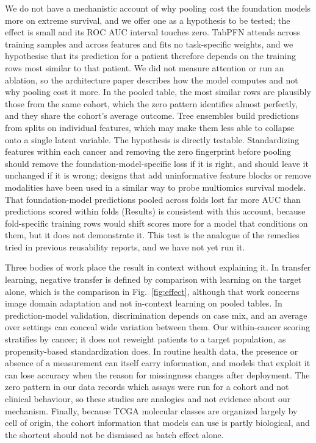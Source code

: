 \documentclass[pdflatex,sn-nature]{sn-jnl}
\begin{document}
We do not have a mechanistic account of why pooling cost the foundation models more on extreme survival, and we offer one as a hypothesis to be tested; the effect is small and its ROC AUC interval touches zero. TabPFN attends across training samples and across features and fits no task-specific weights,\citep{hollmann2025accurate} and we hypothesise that its prediction for a patient therefore depends on the training rows most similar to that patient. We did not measure attention or run an ablation, so the architecture paper describes how the model computes and not why pooling cost it more. In the pooled table, the most similar rows are plausibly those from the same cohort, which the zero pattern identifies almost perfectly, and they share the cohort's average outcome. Tree ensembles build predictions from splits on individual features,\citep{breiman2001random,chen2016xgboost} which may make them less able to collapse onto a single latent variable. The hypothesis is directly testable. Standardizing features within each cancer and removing the zero fingerprint before pooling should remove the foundation-model-specific loss if it is right, and should leave it unchanged if it is wrong; designs that add uninformative feature blocks or remove modalities have been used in a similar way to probe multiomics survival models.\citep{wissel2023systematic} That foundation-model predictions pooled across folds lost far more AUC than predictions scored within folds (Results) is consistent with this account, because fold-specific training rows would shift scores more for a model that conditions on them, but it does not demonstrate it. This test is the analogue of the remedies tried in previous reusability reports, and we have not yet run it.

Three bodies of work place the result in context without explaining it. In transfer learning, negative transfer is defined by comparison with learning on the target alone, which is the comparison in Fig.~\ref{fig:effect}, although that work concerns image domain adaptation and not in-context learning on pooled tables.\citep{wang2019characterizing} In prediction-model validation, discrimination depends on case mix, and an average over settings can conceal wide variation between them.\citep{dejong2023propensity,riley2016external} Our within-cancer scoring stratifies by cancer; it does not reweight patients to a target population, as propensity-based standardization does.\citep{dejong2023propensity} In routine health data, the presence or absence of a measurement can itself carry information, and models that exploit it can lose accuracy when the reason for missingness changes after deployment.\citep{sisk2021informative,rockenschaub2024robust} The zero pattern in our data records which assays were run for a cohort and not clinical behaviour, so these studies are analogies and not evidence about our mechanism. Finally, because TCGA molecular classes are organized largely by cell of origin,\citep{hoadley2018cell} the cohort information that models can use is partly biological, and the shortcut should not be dismissed as batch effect alone.
\end{document}
